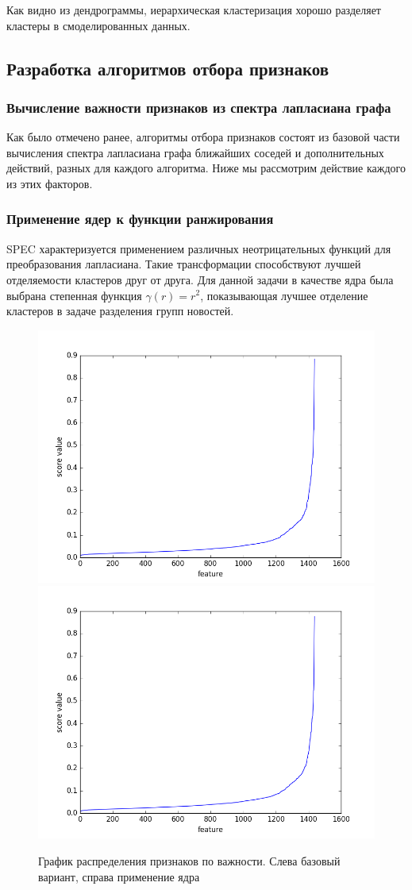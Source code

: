 Как видно из дендрограммы, иерархическая кластеризация хорошо разделяет кластеры в смоделированных данных. 

\subsection{Разработка алгоритмов отбора признаков}
\subsubsection{Вычисление важности признаков из спектра лапласиана графа}
Как было отмечено ранее, алгоритмы отбора признаков состоят из базовой части вычисления спектра лапласиана графа ближайших соседей и дополнительных действий, разных для каждого алгоритма. Ниже мы рассмотрим действие каждого из этих факторов. 
\subsubsection{Применение ядер к функции ранжирования}
SPEC характеризуется применением различных неотрицательных функций для преобразования лапласиана. Такие трансформации способствуют лучшей отделяемости кластеров друг от друга. Для данной задачи в качестве ядра была выбрана степенная функция $\gamma(r) = r^2$, показывающая лучшее отделение кластеров в задаче разделения групп новостей. 
\begin{figure}[h]
  \includegraphics[width=0.5\linewidth]{pics/lp_unnorm_euclidean.png}
  \includegraphics[width=0.5\linewidth]{pics/spec_unnorm_euclidean_no_first.png}
  \caption{График распределения признаков по важности. Слева базовый вариант, справа применение ядра}
  \label{kernel_blob}
\end{figure}

